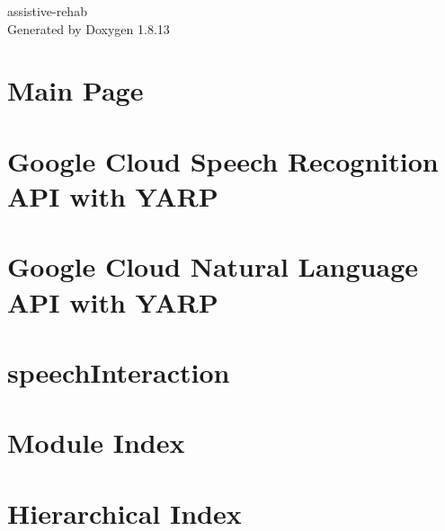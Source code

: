 \documentclass[twoside]{book}
\newcommand{\+}{\discretionary{\mbox{\scriptsize$\hookleftarrow$}}{}{}}
\newcommand{\clearemptydoublepage}{%
  \newpage{\pagestyle{empty}\cleardoublepage}%
}
\begin{document}
\begin{titlepage}
\vspace*{7cm}
\begin{center}%
{\Large assistive-\/rehab }\\
\vspace*{1cm}
{\large Generated by Doxygen 1.8.13}\\
\end{center}
\end{titlepage}
\clearemptydoublepage
{}
\tableofcontents
\clearemptydoublepage
{}

\chapter{Main Page}
\label{index}\hypertarget{index}{}
\chapter{Google Cloud Speech Recognition A\+PI with Y\+A\+RP}
\label{md__home_runner_work_assistive-rehab_assistive-rehab_gh-pages_modules_speechInteraction_modules_googleSpeech_README}

\chapter{Google Cloud Natural Language A\+PI with Y\+A\+RP}
\label{md__home_runner_work_assistive-rehab_assistive-rehab_gh-pages_modules_speechInteraction_modules_googleSpeechProcess_README}

\chapter{speech\+Interaction}
\label{md__home_runner_work_assistive-rehab_assistive-rehab_gh-pages_modules_speechInteraction_README}

\chapter{Module Index}

\chapter{Hierarchical Index}

\end{document}
